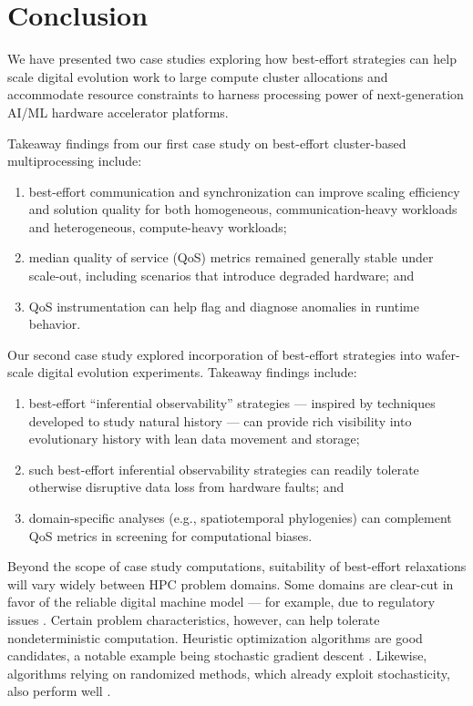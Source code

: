 \vspace{-4.0ex}
\section{Conclusion} \label{moreno:sec:conclusion}
\vspace{-2.0ex}

We have presented two case studies exploring how best-effort strategies can help scale digital evolution work to large compute cluster allocations and accommodate resource constraints to harness processing power of next-generation AI/ML hardware accelerator platforms.

Takeaway findings from our first case study on best-effort cluster-based multiprocessing include:
\begin{enumerate}
\item best-effort communication and synchronization can improve scaling efficiency and solution quality for both homogeneous, communication-heavy workloads and heterogeneous, compute-heavy workloads;
\item median quality of service (QoS) metrics remained generally stable under scale-out, including scenarios that introduce degraded hardware; and
\item QoS instrumentation can help flag and diagnose anomalies in runtime behavior.
\end{enumerate}

Our second case study explored incorporation of best-effort strategies into wafer-scale digital evolution experiments.
Takeaway findings include:
\begin{enumerate}
\item best-effort ``inferential observability'' strategies --- inspired by techniques developed to study natural history --- can provide rich visibility into evolutionary history with lean data movement and storage;
\item such best-effort inferential observability strategies can readily tolerate otherwise disruptive data loss from hardware faults; and
\item domain-specific analyses (e.g., spatiotemporal phylogenies) can complement QoS metrics in screening for computational biases.
\end{enumerate}

Beyond the scope of case study computations, suitability of best-effort relaxations will vary widely between HPC problem domains.
Some domains are clear-cut in favor of the reliable digital machine model \cite{heroux2014toward} --- for example, due to regulatory issues \cite{dongarra2014applied}.
Certain problem characteristics, however, can help tolerate nondeterministic computation.
Heuristic optimization algorithms are good candidates, a notable example being stochastic gradient descent \cite{dean2012large,zhao2019elastic,niu2011hogwild,noel2014dogwild,rhodes2020real}.
Likewise, algorithms relying on randomized methods, which already exploit stochasticity, also perform well \cite{chakrapani2008probabilistic,chakradhar2010best}.

